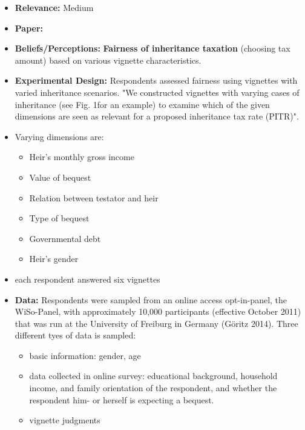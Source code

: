 \documentclass[a4paper, 12pt]{article}
\begin{document}
\begin{itemize}
    \item \textbf{Relevance:} Medium
    \item \textbf{Paper:} 
    \item \textbf{Beliefs/Perceptions:} \textbf{Fairness of inheritance taxation} (choosing tax amount) based on various vignette characteristics.
    \item \textbf{Experimental Design:} Respondents assessed fairness using vignettes with varied inheritance scenarios. "We constructed vignettes with varying cases of inheritance (see Fig. 1for an example) to examine which of the given dimensions are seen as relevant for a proposed inheritance tax rate (PITR)".
    \item Varying dimensions are: 
    \begin{itemize}
        \item Heir's monthly gross income
        \item Value of bequest
        \item Relation between testator and heir
        \item Type of bequest
        \item Governmental debt
        \item Heir's gender
    \end{itemize}
    \item each respondent answered six vignettes
    \item \textbf{Data:} Respondents were sampled from an online access opt-in-panel, the WiSo-Panel, with approximately 10,000 participants (effective October 2011) that was run at the University of Freiburg in Germany (Göritz 2014). Three different tyes of data is sampled: 
    \begin{itemize}
        \item basic information: gender, age
        \item data collected in online survey: educational background, household income, and family orientation of the respondent, and whether the respondent him- or herself is expecting a bequest.
        \item vignette judgments
    \end{itemize}
\end{itemize}
\end{document}

